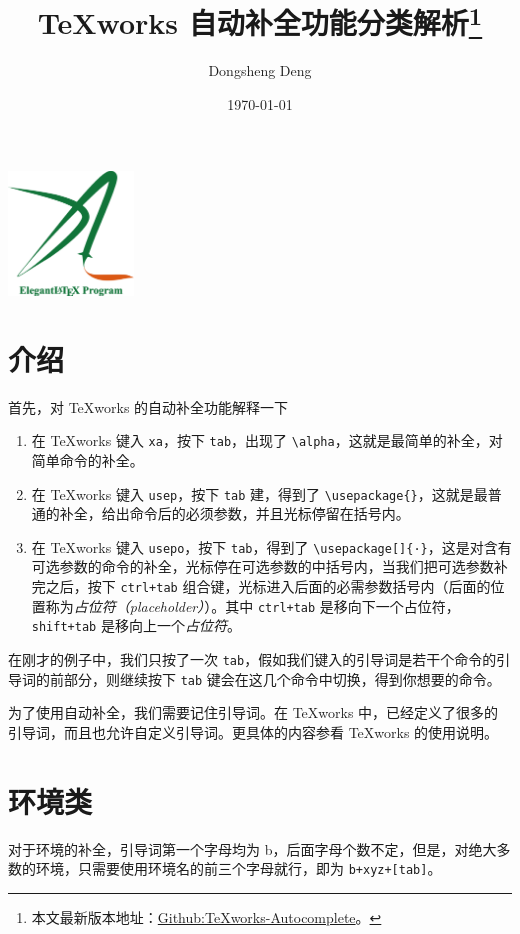 \documentclass[geye,green,pad,cn]{elegantnote}
\title{\TeX{}works 自动补全功能分类解析\footnote{本文最新版本地址：\href{https://github.com/EthanDeng/texworks-autocomplete}{Github:TeXworks-Autocomplete}。}}
\author{Dongsheng Deng}
\institute{Elegant\LaTeX{} 项目组}
\date{\today}
\begin{document}
\maketitle
\centerline{\includegraphics[width=0.25\textwidth]{logo.png}}



\section{介绍}

首先，对 \TeX{}works 的自动补全功能解释一下

\begin{enumerate}
\item  在 \TeX{}works 键入 \lstinline{xa}，按下 \lstinline{tab}，出现了 \lstinline{\alpha}，这就是最简单的补全，对简单命令的补全。
\item 在 \TeX{}works 键入 \lstinline{usep}，按下 \lstinline{tab} 建，得到了 \lstinline|\usepackage{}|，这就是最普通的补全，给出命令后的必须参数，并且光标停留在括号内。
\item 在 \TeX{}works 键入 \lstinline{usepo}，按下 \lstinline{tab}，得到了 \lstinline|\usepackage[]{·}|，这是对含有可选参数的命令的补全，光标停在可选参数的中括号内，当我们把可选参数补完之后，按下 \lstinline{ctrl+tab} 组合键，光标进入后面的必需参数括号内（后面的位置称为\textit{占位符（placeholder）}）。其中 \lstinline{ctrl+tab} 是移向下一个占位符，\lstinline{shift+tab} 是移向上一个\textit{占位符}。
\end{enumerate}

在刚才的例子中，我们只按了一次 \lstinline{tab}，假如我们键入的引导词是若干个命令的引导词的前部分，则继续按下 \lstinline{tab} 键会在这几个命令中切换，得到你想要的命令。

为了使用自动补全，我们需要记住引导词。在 \TeX{}works 中，已经定义了很多的引导词，而且也允许自定义引导词。更具体的内容参看 \TeX{}works 的使用说明。

\section{环境类}

对于环境的补全，引导词第一个字母均为 b，后面字母个数不定，但是，对绝大多数的环境，只需要使用环境名的前三个字母就行，即为 \lstinline{b+xyz+[tab]}。
\end{document}
